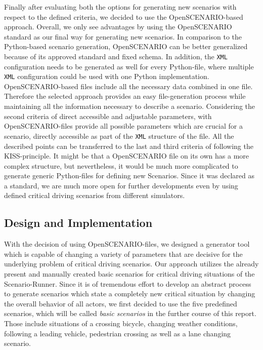 \documentclass[conference, a4paper, 11pt]{IEEEtran}
\begin{document}
	Finally after evaluating both the options for generating new scenarios with respect to the defined criteria, we decided to use the OpenSCENARIO-based approach. Overall, we only see advantages by using the OpenSCENARIO standard as our final way for generating new scenarios. In comparison to the Python-based scenario generation, OpenSCENARIO can be better generalized because of its approved standard and fixed schema. In addition, the \texttt{XML} configuration needs to be generated as well for every Python-file, where multiple \texttt{XML} configuration could be used with one Python implementation. OpenSCENARIO-based files include all the necessary data combined in one file. Therefore the selected approach provides an easy file-generation process while maintaining all the information necessary to describe a scenario. Considering the second criteria of direct accessible and adjustable parameters, with OpenSCENARIO-files provide all possible parameters which are crucial for a scenario, directly accessible as part of the \texttt{XML} structure of the file.
	All the described points can be transferred to the last and third criteria of following the KISS-principle. It might be that a OpenSCENARIO file on its own has a more complex structure, but nevertheless, it would be much more complicated to generate generic Python-files for defining new Scenarios. Since it was declared as a standard, we are much more open for further developments even by using defined critical driving scenarios from different simulators.
	
	\subsection{Design and Implementation}
	With the decision of using OpenSCENARIO-files, we designed a generator tool which is capable of changing a variety of parameters that are decisive for the underlying problem of critical driving scenarios. Our approach utilizes the already present and manually created basic scenarios for critical driving situations of the Scenario-Runner. Since it is of tremendous effort to develop an abstract process to generate scenarios which state a completely new critical situation by changing the overall behavior of all actors, we first decided to use the five predefined scenarios, which will be called \textit{basic scenarios} in the further course of this report. Those include situations of a crossing bicycle,  changing weather conditions, following a leading vehicle, pedestrian crossing as well as a lane changing scenario.
	
\end{document}
